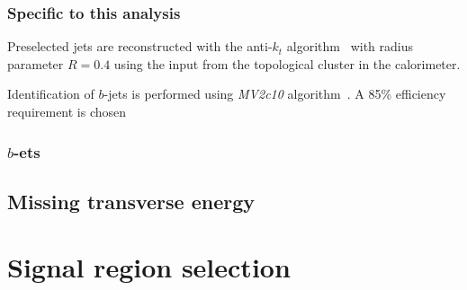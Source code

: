 
\subsubsection{Specific to this analysis}
\label{subsubsec:event_jets_specific}
Preselected jets are reconstructed with the anti-$k_{t}$ algorithm~\cite{} with radius parameter $R = 0.4$ using the input from the topological cluster in the calorimeter.

Identification of $b$-jets is performed using \textit{MV2c10} algorithm~\cite{}.
A 85\% efficiency requirement is chosen


\subsubsection{$b$-ets}
\label{subsubsec:event_bjets}


\subsection{Missing transverse energy}
\label{subsec:event_met}


\section{Signal region selection}
\label{sec:event_signal_region_selection}



